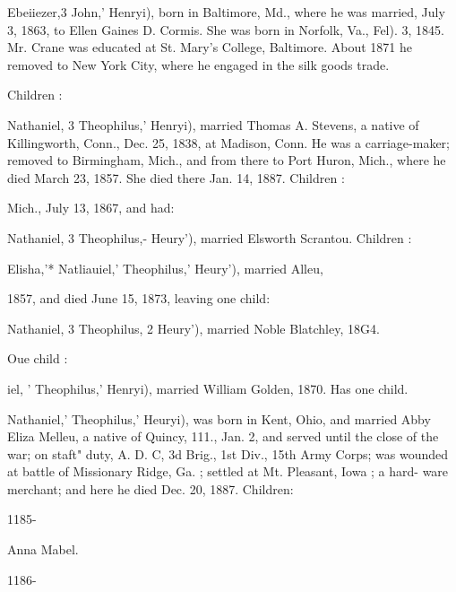 \documentclass[oneside]{book}
\begin{document}
Ebeiiezer,3 John,' Henryi), born in Baltimore, Md., where he 
was married, July 3, 1863, to Ellen Gaines D. Cormis. She was 
born in Norfolk, Va., Fel). 3, 1845. Mr. Crane was educated 
at St. Mary's College, Baltimore. About 1871 he removed to 
New York City, where he engaged in the silk goods trade. 

Children : 








Nathaniel, 3 Theophilus,' Henryi), married Thomas A. Stevens, 
a native of Killingworth, Conn., Dec. 25, 1838, at Madison, 
Conn. He was a carriage-maker; removed to Birmingham, 
Mich., and from there to Port Huron, Mich., where he died 
March 23, 1857. She died there Jan. 14, 1887. Children : 






Mich., July 13, 1867, and had: 








Nathaniel, 3 Theophilus,- Heury'), married Elsworth Scrantou. 
Children : 










Elisha,'* Natliauiel,' Theophilus,' Heury'), married Alleu, 

1857, and died June 15, 1873, leaving one child: 


Nathaniel, 3 Theophilus, 2 Heury'), married Noble Blatchley, 18G4. 

Oue child : 

iel, ' Theophilus,' Henryi), married William Golden, 1870. Has 
one child. 

Nathaniel,' Theophilus,' Heuryi), was born in Kent, Ohio, and 
married Abby Eliza Melleu, a native of Quincy, 111., Jan. 2, 
and served until the close of the war; on staft" duty, A. D. C, 
3d Brig., 1st Div., 15th Army Corps; was wounded at battle of 
Missionary Ridge, Ga. ; settled at Mt. Pleasant, Iowa ; a hard- 
ware merchant; and here he died Dec. 20, 1887. Children: 



1185- 




Anna Mabel. 


1186- 
\end{document}
